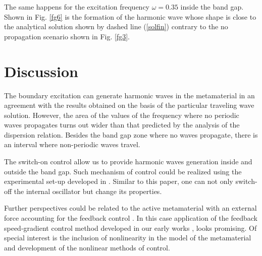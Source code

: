 The same happens for the excitation frequency $\omega=0.35$ inside the band gap. Shown in Fig. \ref{fg6} is the formation of the harmonic wave whose shape is close to the analytical solution shown by dashed line  (\ref{solfin})  contrary to the no propagation scenario shown in Fig. \ref{fg3}.



\section{Discussion}

The boundary excitation can generate harmonic waves in the metamaterial in an agreement with the results obtained on the basis of the particular traveling wave solution. However, the area of the values of the frequency where no periodic waves propagates turns out wider than that predicted by the analysis of the dispersion relation. Besides the band gap zone where no waves propagate, there is an interval where non-periodic waves travel.

The switch-on control allow us to provide harmonic waves generation inside and outside the band gap. Such mechanism of control could be realized using the experimental set-up developed in \cite{Yang}. Similar to this paper, one can not only switch- off the internal oscillator but change its properties.

Further perspectives could be related to the active metamaterial with an external force accounting for the feedback control \cite{Pope2012,Pope2014}. In this case application of the feedback speed-gradient control  method developed in our early works \cite{Fradkov2007,  Porubov etal.2016}, looks promising. Of special interest is the inclusion of nonlinearity in the model of the metamaterial and development of the nonlinear methods of control.
